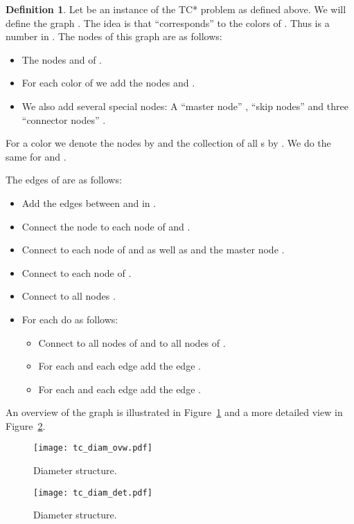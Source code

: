 \documentclass[a4paper,11pt]{article}
\theoremstyle{definition}
\newtheorem{definition}{Definition}
\begin{document}
\begin{definition}
    Let  be an instance of the TC* problem as defined above. We will define
    the graph . The idea is that 
    ``corresponds'' to the colors  of .
    Thus  is a number in . The nodes of this graph are as
    follows:
    \begin{itemize}
        \item The nodes  and  of .
        \item For each color  of  we
            add the nodes  and
            .
        \item We also add several special nodes: A ``master node'' ,
             ``skip nodes''  and three ``connector nodes''
            .
    \end{itemize}
    For a color  we denote the nodes
     by  and the collection of all s by .
    We do the same for  and .

    The edges of  are as follows:
    \begin{itemize}
        \item Add the edges between  and  in .
        \item Connect the node  to each node of  and .
        \item Connect  to each node of  and  as well as  and
            the master node .
        \item Connect  to each node of .
        \item Connect  to all nodes .
        \item For each  do as follows:
            \begin{itemize}
                \item Connect  to all nodes of  and to all
                    nodes of .
                \item For each  and each edge  add the edge .
                \item For each  and each edge  add the edge .
            \end{itemize}
    \end{itemize}
\end{definition}
An overview of the graph  is illustrated in Figure~\ref{fig:34diam}
and a more detailed view in Figure~\ref{fig:tc_diam_det}.

\begin{figure}[htbp]
    \centering
    \texttt{[image: tc\_diam\_ovw.pdf]}
    \caption{Diameter structure.}
    \label{fig:34diam}
\end{figure}
\begin{figure}[htbp]
    \centering
    \texttt{[image: tc\_diam\_det.pdf]}
    \caption{Diameter structure.}
    \label{fig:tc_diam_det}
\end{figure}
\end{document}

